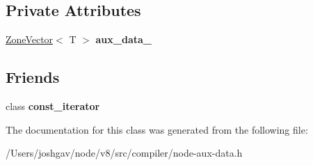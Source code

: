\subsection*{Private Attributes}
\begin{DoxyCompactItemize}
\item 
\hyperlink{classv8_1_1internal_1_1_zone_vector}{Zone\+Vector}$<$ T $>$ {\bfseries aux\+\_\+data\+\_\+}\hypertarget{classv8_1_1internal_1_1compiler_1_1_node_aux_data_af229487c2f4d8d8098954c592b6c10c6}{}\label{classv8_1_1internal_1_1compiler_1_1_node_aux_data_af229487c2f4d8d8098954c592b6c10c6}

\end{DoxyCompactItemize}
\subsection*{Friends}
\begin{DoxyCompactItemize}
\item 
class {\bfseries const\+\_\+iterator}\hypertarget{classv8_1_1internal_1_1compiler_1_1_node_aux_data_ac220ce1c155db1ac44146c12d178056f}{}\label{classv8_1_1internal_1_1compiler_1_1_node_aux_data_ac220ce1c155db1ac44146c12d178056f}

\end{DoxyCompactItemize}


The documentation for this class was generated from the following file\+:\begin{DoxyCompactItemize}
\item 
/\+Users/joshgav/node/v8/src/compiler/node-\/aux-\/data.\+h\end{DoxyCompactItemize}
